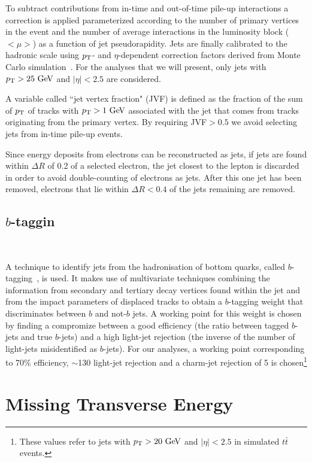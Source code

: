 To subtract contributions from in-time and out-of-time pile-up interactions a correction is applied
parameterized according to the number of primary vertices in the event and the number of average interactions 
in the luminosity block ($<\mu>$) as a function of jet pseudorapidity.
Jets are finally calibrated to the hadronic scale using $\pt$- and $\eta$-dependent correction factors 
derived from Monte Carlo simulation~\cite{jes}.
For the analyses that we will present, only jets with $\pt > 25\gev$ and $|\eta| < 2.5$ are considered.

A variable called ``jet vertex fraction" (JVF) is defined as the fraction
of the sum of $\pt$ of tracks with $\pt>1\gev$
associated with the jet that comes from tracks originating from the primary vertex.
By requiring JVF$>0.5$ we avoid selecting jets from in-time pile-up events.

Since energy deposits from electrons can be reconstructed as jets, 
if jets are found within $\Delta R$ of 0.2 of a selected electron, the
jet closest to the lepton is discarded in order to avoid double-counting of electrons as jets.
After this one jet has been removed, electrons that lie within $\Delta R< 0.4$ of 
the jets remaining are removed.

\subsection{$b$-taggin}~\label{sec:btagging}

A technique to identify jets from the hadronisation of bottom quarks, 
called $b$-tagging~\cite{ref:ATLAS-CONF-2011-102}, is used. It
makes use of multivariate techniques combining the information
from secondary and tertiary decay vertices found within the jet
and from the impact parameters of displaced tracks to obtain a 
$b$-tagging weight that discriminates between $b$ and not-$b$
jets. A working point for this weight is chosen by finding
a compromize between a good efficiency (the ratio between tagged 
$b$-jets and true $b$-jets) and a high light-jet rejection
(the inverse of the number of light-jets misidentified as $b$-jets).
For our analyses, a working point corresponding to  70\% efficiency, 
$\sim$130 light-jet rejection and a charm-jet rejection of 5 is 
chosen\footnote{These values refer to jets with $\pt >20\gev$ and 
$|\eta|<2.5$ in simulated $t\bar{t}$ events.}


\section{Missing Transverse Energy}\label{sec:met}

